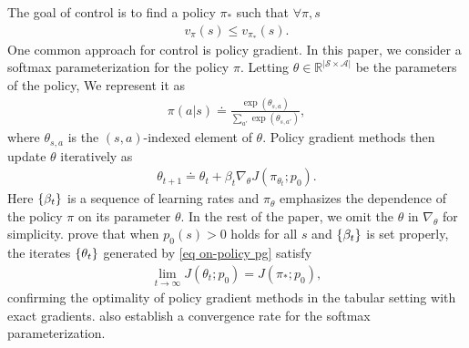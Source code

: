 \documentclass[twoside,11pt]{article}
\newcommand{\fS}{\mathcal{S}}
\newcommand{\fA}{\mathcal{A}}
\newcommand{\R}{\mathbb{R}}
\newcommand{\nsa}{{|\fS \times \fA|}}
\numberwithin{assucounter}{section}
\begin{document}
The goal of control is to find a policy $\pi_*$ such that $\forall \pi, s$
\begin{align}
  \label{eq optimal policy}
  v_\pi(s) \leq v_{\pi_*}(s).
\end{align}
One common approach for control is policy gradient.
In this paper,
we consider a softmax parameterization for the policy $\pi$.
Letting $\theta \in \R^\nsa$ be the parameters of the policy,
We represent it as
\begin{align}
  \pi(a|s) \doteq \frac{\exp(\theta_{s,a})}{\sum_{a'}\exp(\theta_{s,a'})},
\end{align}
where $\theta_{s,a}$ is the $(s, a)$-indexed element of $\theta$.
Policy gradient methods then update $\theta$ iteratively as
\begin{align}
  \label{eq on-policy pg}
  \theta_{t+1} \doteq \theta_t + \beta_t \nabla_{\theta} J(\pi_{\theta_t}; p_0).
\end{align}
Here $\qty{\beta_t}$ is a sequence of learning rates and
$\pi_\theta$ emphasizes the dependence of the policy $\pi$ on its parameter $\theta$.
In the rest of the paper,
we omit the $\theta$ in $\nabla_\theta$ for simplicity.
\citet{agarwal2019optimality,mei2020global} prove that when $p_0(s) > 0$ holds for all $s$ and $\qty{\beta_t}$ is set properly,
the iterates $\qty{\theta_t}$ generated by \eqref{eq on-policy pg} satisfy
\begin{align}
  \lim_{t\to\infty} J(\theta_t; p_0) = J(\pi_*;p_0),
\end{align}
confirming the optimality of policy gradient methods in the tabular setting with exact gradients.
\citet{mei2020global} also establish a convergence rate for the softmax parameterization.
\end{document}
